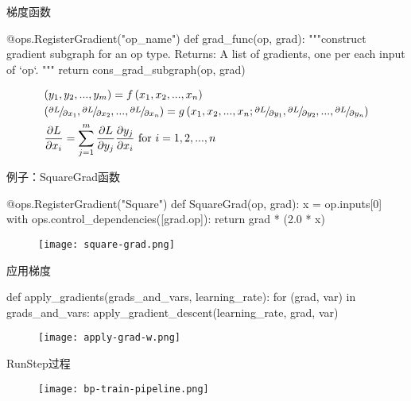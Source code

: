 \begin{frame}[fragile]{梯度函数}
  \begin{python}
@ops.RegisterGradient("op_name")
def grad_func(op, grad):
  """construct gradient subgraph for an op type.
  Returns:
    A list of gradients, one per each input of `op`.
  """
  return cons_grad_subgraph(op, grad) 
  \end{python}

\[\begin{gathered}
  \left( {{y_1},{y_2},...,{y_m}} \right) = f\left( {{x_1},{x_2},...,{x_n}} \right) \hfill \\
  \left( {{\raise0.5ex\hbox{$\scriptstyle {\partial L}$}
\kern-0.1em/\kern-0.15em
\lower0.25ex\hbox{$\scriptstyle {\partial {x_1}}$}},{\raise0.5ex\hbox{$\scriptstyle {\partial L}$}
\kern-0.1em/\kern-0.15em
\lower0.25ex\hbox{$\scriptstyle {\partial {x_2}}$}},...,{\raise0.5ex\hbox{$\scriptstyle {\partial L}$}
\kern-0.1em/\kern-0.15em
\lower0.25ex\hbox{$\scriptstyle {\partial {x_n}}$}}} \right) = g\left( {{x_1},{x_2},...,{x_n};{\raise0.5ex\hbox{$\scriptstyle {\partial L}$}
\kern-0.1em/\kern-0.15em
\lower0.25ex\hbox{$\scriptstyle {\partial {y_1}}$}},{\raise0.5ex\hbox{$\scriptstyle {\partial L}$}
\kern-0.1em/\kern-0.15em
\lower0.25ex\hbox{$\scriptstyle {\partial {y_2}}$}},...,{\raise0.5ex\hbox{$\scriptstyle {\partial L}$}
\kern-0.1em/\kern-0.15em
\lower0.25ex\hbox{$\scriptstyle {\partial {y_n}}$}}} \right) \hfill \\
  \frac{{\partial L}}{{\partial {x_i}}} = \sum\limits_{j = 1}^m {\frac{{\partial L}}{{\partial {y_j}}}\frac{{\partial {y_j}}}{{\partial {x_i}}}} {\text{     for }}i = 1,2,...,n{\text{ }} \hfill \\ 
\end{gathered} \]
\end{frame}

\begin{frame}[fragile]{例子：SquareGrad函数}
  \begin{python}
@ops.RegisterGradient("Square")
def SquareGrad(op, grad):
  x = op.inputs[0]
  with ops.control_dependencies([grad.op]):
    return grad * (2.0 * x)
  \end{python}

  \begin{figure}
    \centering
    \texttt{[image: square-grad.png]}
  \end{figure}
\end{frame}

\begin{frame}[fragile]{应用梯度}
  \begin{python} 
def apply_gradients(grads_and_vars, learning_rate):
  for (grad, var) in grads_and_vars:
    apply_gradient_descent(learning_rate, grad, var)
  \end{python}
  \begin{figure}
    \centering
    \texttt{[image: apply-grad-w.png]}
  \end{figure}  
\end{frame}

\begin{frame}{RunStep过程}
  \begin{figure}
    \centering
    \texttt{[image: bp-train-pipeline.png]}
  \end{figure}
\end{frame}
